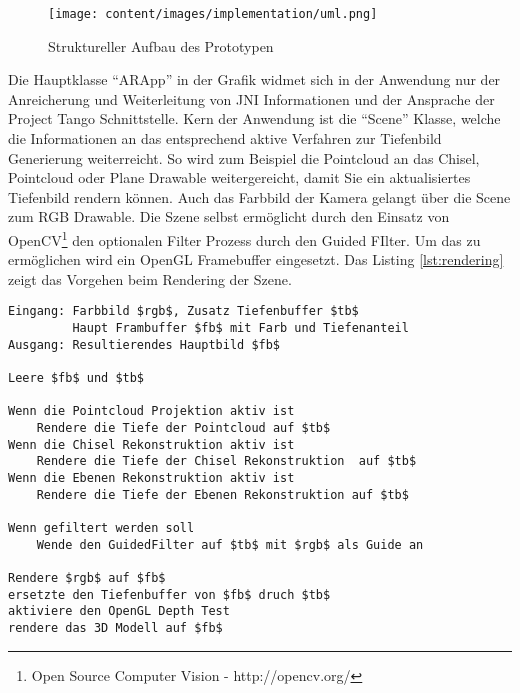 \begin{figure}[h]
  \centering
	\texttt{[image: content/images/implementation/uml.png]} 
  \caption{Struktureller Aufbau des Prototypen}
  \label{fig:structure}
\end{figure}

Die Hauptklasse \enquote{ARApp} in der Grafik widmet sich in der Anwendung nur der Anreicherung und Weiterleitung von JNI Informationen und der Ansprache der Project Tango Schnittstelle. Kern der Anwendung ist die \enquote{Scene} Klasse, welche die Informationen an das entsprechend aktive Verfahren zur Tiefenbild Generierung weiterreicht. So wird zum Beispiel die Pointcloud an das Chisel, Pointcloud oder Plane Drawable weitergereicht, damit Sie ein aktualisiertes Tiefenbild rendern können. Auch das Farbbild der Kamera gelangt über die Scene zum RGB Drawable. Die Szene selbst ermöglicht durch den Einsatz von OpenCV\footnote{Open Source Computer Vision - http://opencv.org/} den optionalen Filter Prozess durch den Guided FIlter. Um das zu ermöglichen wird ein OpenGL Framebuffer eingesetzt. Das Listing \ref{lst:rendering} zeigt das Vorgehen beim Rendering der Szene.

\begin{lstlisting}[mathescape,caption=Rendering der Szene, label=lst:rendering, float=htbp]
Eingang: Farbbild $rgb$, Zusatz Tiefenbuffer $tb$
         Haupt Frambuffer $fb$ mit Farb und Tiefenanteil
Ausgang: Resultierendes Hauptbild $fb$

Leere $fb$ und $tb$

Wenn die Pointcloud Projektion aktiv ist
    Rendere die Tiefe der Pointcloud auf $tb$
Wenn die Chisel Rekonstruktion aktiv ist
    Rendere die Tiefe der Chisel Rekonstruktion  auf $tb$
Wenn die Ebenen Rekonstruktion aktiv ist
    Rendere die Tiefe der Ebenen Rekonstruktion auf $tb$
    
Wenn gefiltert werden soll
    Wende den GuidedFilter auf $tb$ mit $rgb$ als Guide an
        
Rendere $rgb$ auf $fb$ 
ersetzte den Tiefenbuffer von $fb$ druch $tb$
aktiviere den OpenGL Depth Test
rendere das 3D Modell auf $fb$
\end{lstlisting}
